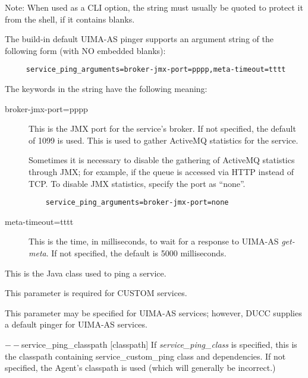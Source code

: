 \begin{description}
        Note: When used as a CLI option, the string must usually be
        quoted to protect it from the shell, if it contains blanks.

        The build-in default UIMA-AS pinger supports an argument string of the following form
        (with NO embedded blanks):
\begin{verbatim}
     service_ping_arguments=broker-jmx-port=pppp,meta-timeout=tttt
\end{verbatim}
        
        The keywords in the string have the following meaning:
        \begin{description}
          \item[broker-jmx-port=pppp] This is the JMX port for the service's broker.  If not
            specified, the default of 1099 is used.  This is used to gather ActiveMQ statistics
            for the service.

            Sometimes it is necessary to disable the gathering of ActiveMQ statistics through
            JMX; for example, if the queue is accessed via HTTP instead of TCP.  To disable
            JMX statistics, specify the port as ``none''.
\begin{verbatim}
    service_ping_arguments=broker-jmx-port=none
\end{verbatim}
          \item[meta-timeout=tttt] This is the time, in milliseconds, to wait for a response
            to UIMA-AS {\em get-meta}.  If not specified, the default is 5000 milliseconds.
        \end{description}
      
      \item[$--$service\_ping\_class {[classname]}] This is the Java class used to ping a service. 

        This parameter is required for CUSTOM services.

        This parameter may be specified for UIMA-AS services; however, DUCC supplies a default
        pinger for UIMA-AS services.

      \begin{sloppypar}  
      \item[$--$service\_ping\_classpath {[classpath]}] If {\em service\_ping\_class} is specified,
        this is the classpath containing service\_custom\_ping class and dependencies.  If not
        specified, the Agent's classpath is used (which will generally be incorrect.)
      \end{sloppypar}
      

\end{description}
